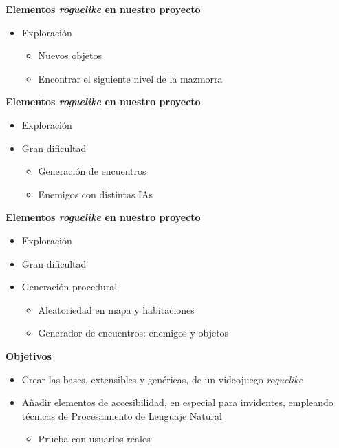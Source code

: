 \begin{tframe}{\textbf{Elementos \textit{roguelike} en nuestro proyecto}}
	\begin{itemize}
		\item<+-| alert@+> Exploración
			\begin{itemize}
				\item Nuevos objetos
				\item Encontrar el siguiente nivel de la mazmorra
			\end{itemize}
	\end{itemize}
\end{tframe}

\begin{tframe}{\textbf{Elementos \textit{roguelike} en nuestro proyecto}}
	\begin{itemize}
		\item Exploración
		\item<+-| alert@+> Gran dificultad
		\begin{itemize}
			\item Generación de encuentros
			\item Enemigos con distintas IAs
		\end{itemize}
	\end{itemize}
\end{tframe}

\begin{tframe}{\textbf{Elementos \textit{roguelike} en nuestro proyecto}}
	\begin{itemize}
		\item Exploración
		\item Gran dificultad
		\item<+-| alert@+> Generación procedural
		\begin{itemize}
			\item Aleatoriedad en mapa y habitaciones
			\item Generador de encuentros: enemigos y objetos
		\end{itemize}
	\end{itemize}
\end{tframe}


\begin{tframe}{\textbf{Objetivos}}
	\begin{itemize}
		\item Crear las bases, extensibles y genéricas, de un videojuego \textit{roguelike}
		\item<+-| alert@+> Añadir elementos de accesibilidad, en especial para invidentes, empleando técnicas de Procesamiento de Lenguaje Natural
		\begin{itemize}
			\item Prueba con usuarios reales
		\end{itemize}
	\end{itemize}
\end{tframe}

